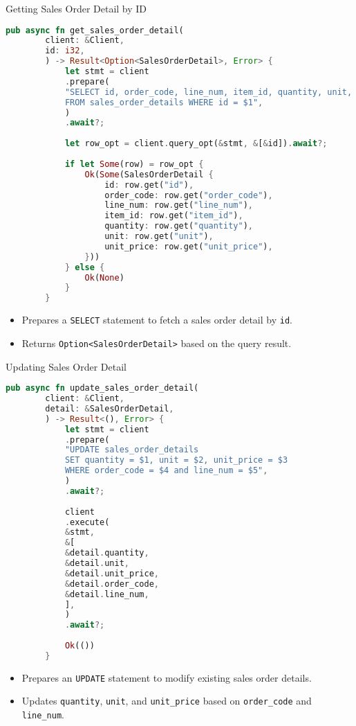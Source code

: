 \documentclass[aspectratio=169, table]{beamer}
\begin{document}
\begin{frame}[fragile]{Getting Sales Order Detail by ID}
	\begin{lstlisting}[language=Rust]
		pub async fn get_sales_order_detail(
		client: &Client,
		id: i32,
		) -> Result<Option<SalesOrderDetail>, Error> {
			let stmt = client
			.prepare(
			"SELECT id, order_code, line_num, item_id, quantity, unit, unit_price
			FROM sales_order_details WHERE id = $1",
			)
			.await?;
			
			let row_opt = client.query_opt(&stmt, &[&id]).await?;
			
			if let Some(row) = row_opt {
				Ok(Some(SalesOrderDetail {
					id: row.get("id"),
					order_code: row.get("order_code"),
					line_num: row.get("line_num"),
					item_id: row.get("item_id"),
					quantity: row.get("quantity"),
					unit: row.get("unit"),
					unit_price: row.get("unit_price"),
				}))
			} else {
				Ok(None)
			}
		}
	\end{lstlisting}
	\begin{itemize}
		\item Prepares a \texttt{SELECT} statement to fetch a sales order detail by \texttt{id}.
		\item Returns \texttt{Option<SalesOrderDetail>} based on the query result.
	\end{itemize}
\end{frame}

\begin{frame}[fragile]{Updating Sales Order Detail}
	\begin{lstlisting}[language=Rust]
		pub async fn update_sales_order_detail(
		client: &Client,
		detail: &SalesOrderDetail,
		) -> Result<(), Error> {
			let stmt = client
			.prepare(
			"UPDATE sales_order_details
			SET quantity = $1, unit = $2, unit_price = $3
			WHERE order_code = $4 and line_num = $5",
			)
			.await?;
			
			client
			.execute(
			&stmt,
			&[
			&detail.quantity,
			&detail.unit,
			&detail.unit_price,
			&detail.order_code,
			&detail.line_num,
			],
			)
			.await?;
			
			Ok(())
		}
	\end{lstlisting}
	\begin{itemize}
		\item Prepares an \texttt{UPDATE} statement to modify existing sales order details.
		\item Updates \texttt{quantity}, \texttt{unit}, and \texttt{unit\_price} based on \texttt{order\_code} and \texttt{line\_num}.
	\end{itemize}
\end{frame}
\end{document}
